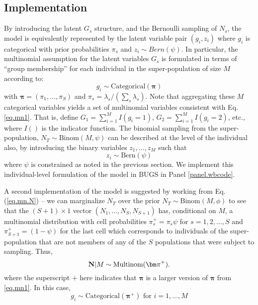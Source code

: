 \subsection{Implementation}
\label{sec.implementation}

By introducing the latent $G_{s}$ structure, and the Bernoulli
sampling
of $N_{s}$,
the model is equivalently represented by 
the 
latent variable pair $(g_{i},z_{i})$ where $g_{i}$ is categorical
with prior probabilities $\pi_{s}$ and $z_{i} \sim Bern(\psi)$.  
In particular, 
the multinomial assumption for the latent variables $G_{s}$
is formulated in terms of  ``group membership'' for  each individual
in the super-population of size $M$ according to:
\[
 g_{i} \sim \mbox{Categorical}\left( {\bm \pi} \right)
\]
with ${\bm \pi} = (\pi_{1}, \ldots, \pi_{S})$ and $\pi_{s} =  \lambda_{s}/(\sum_{s}
     \lambda_{s})$.
Note that aggregating these $M$
categorical variables yields a set of multinomial variables
consistent with Eq. \ref{eq.mn1}. That is, define 
$G_{1} = \sum_{i=1}^{M} I(g_{i} = 1)$, 
$G_{2} = \sum_{i=1}^{M} I(g_{i} = 2)$, etc., where $I()$ is the
indicator function. 
The binomial sampling from the super-population, 
$N_{T} \sim \mbox{Binom}(M, \psi)$
can be described at the level of the individual also, 
 by introducing the binary
variables $z_{1},\ldots,z_{M}$ such that
\[
 z_{i} \sim \mbox{Bern}(\psi)
\]
where $\psi$ is constrained as noted in the previous section. 
We implement this individual-level formulation of the model in BUGS in
Panel \ref{panel.wbcode}.



A second implementation of the model is suggested by working from
Eq. (\ref{eq.mn.N}) -- we can marginalize $N_{T}$
over the prior  $N_{T} \sim \mbox{Binom}(M, \phi)$ to see that 
the  $(S+1) \times 1$ vector 
$(N_{1},\ldots,N_{S},N_{S+1})$ has, conditional on $M$, 
a multinomial distribution 
with cell probabilities
$\pi_{s}^{+} = \pi_{s} \psi$ for $s=1,2,\ldots,S$  and 
 $\pi_{S+1}^{+} = (1-\psi)$ for the last cell which
 corresponds to individuals of the super-population that are not
 members of any of the $S$ populations that were subject to sampling. 
Thus,
\[
{\bf N}|M \sim \mbox{Multinom}({\bm \pi}^{+}).
\]
where the superscript $+$ here indicates that ${\bm \pi}$ is a larger
version of ${\bm \pi}$ from \ref{eq.mn1}.
In this case, 
\begin{equation}
g_{i}  \sim \mbox{Categorical}( {\bm \pi}^{+} ) \mbox{ for
  $i=1,\ldots,M$}  \label{eq.parm1c}
\end{equation}




